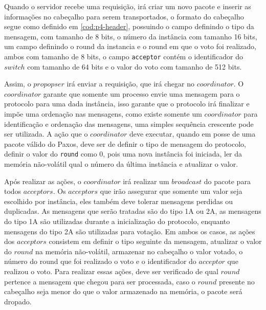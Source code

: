 \documentclass[12pt,
openright, 
oneside,
a4paper,
brazil]{facom-ufu-abntex2}
\theoremstyle{definition}
\begin{document}
Quando o servidor recebe uma requisição, irá criar um novo pacote e inserir as informações no
cabeçalho para serem transportados, o formato do cabeçalho segue como definido em \ref{cod:p4-header}, 
possuindo o campo definindo o tipo da mensagem, com tamanho de 8 bits, o número da instância com tamanho 16 bits,
um campo definindo o round da instancia e o round em que o voto foi realizado, ambos com tamanho de
8 bits, o campo \texttt{acceptor} contém o identificador do $switch$ com tamanho de 64 bits e o valor do
voto com tamanho de 512 bits.



Assim, o $propopser$ irá enviar a requisição, que irá chegar no $coordinator$. O $coordinator$ garante que
somente um processo envie uma mensagem para o protocolo para uma dada instância, isso garante 
que o protocolo irá finalizar e impõe uma ordenação nas mensagens, como existe somente um
$coordinator$ para identificação e ordenação das mensagens, uma simples sequência crescente pode ser
utilizada. A ação que o $coordinator$ deve executar, quando em posse de uma pacote válido do Paxos,
deve ser de definir o tipo de mensagem do protocolo, definir o valor do \texttt{round} como 0, pois
uma nova instância foi iniciada, ler da memória não-volátil qual o número da última instância e atualizar
o valor\citep{dang2016paxos}.




Após realizar as ações, o $coordinator$ irá realizar um $broadcast$ do pacote para todos $acceptors$.
Os $acceptors$ que irão assegurar que somente um valor seja escolhido por instância, eles também deve tolerar
mensagens perdidas ou duplicadas. As mensagens que serão tratadas são do tipo 1A ou 2A, as mensagens do
tipo 1A são utilizadas durante a inicialização do protocolo, enquanto mensagens do tipo 2A são utilizadas
para votação. Em ambos os casos, as ações dos $acceptors$ consistem em definir o tipo seguinte da mensagem,
atualizar o valor do $round$ na memória não-volátil, armazenar no cabeçalho o valor votado, o número do
round que foi realizado o voto e o identificador do $acceptor$ que realizou o voto. Para realizar
essas ações, deve ser verificado de qual $round$ pertence a mensagem que chegou para ser processada,
caso o $round$ presente no cabeçalho seja menor do que o valor armazenado na memória, o pacote será 
dropado\cite{dang2016paxos}.
\end{document}
